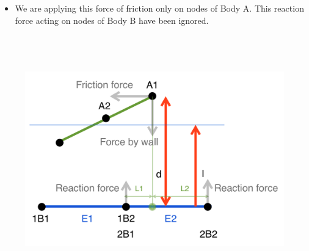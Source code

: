\documentclass[12pt]{report}
\begin{document}
\begin{itemize}
\begin{itemize}
 \[ u =  \left\{ \begin{array}{c}
	v_{poc}\frac{ \mu _{s}}{v_{th}}\\
	u_{s}-v_{poc}\frac{ \left(  \mu _{s}- \mu _{k} \right) }{0.5\astv_{th}}\\
	 \mu _{k}\\
	\end{array} ~\begin{matrix}
v_{poc}~<~v_{th}\\
v_{th} <= v_{poc} <= 1.5\astv_{th}\\
v_{poc}~>~v_{th}\\
\end{matrix}
 \] \par

Here, the v\textsubscript{poc} is velocity at point of contact and v\textsubscript{th} is the threshold velocity.\par

	\item We are applying this force of friction only on nodes of Body A. This reaction force acting on nodes of Body B have been ignored.
\end{itemize}
\end{itemize}\par




\begin{figure}[H]
\advance\leftskip 0.0in		\includegraphics[width=6.27in,height=4.23in]{./media/image8.png}
\end{figure}
\end{document}
